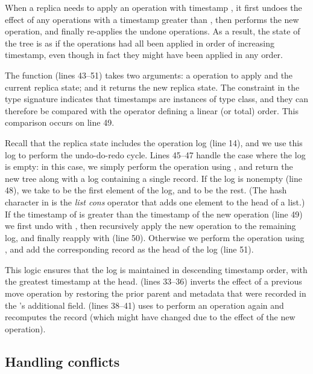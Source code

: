 \documentclass[sigplan,anonymous]{acmart}
\begin{document}
When a replica needs to apply an operation with timestamp , it first undoes the effect of any operations with a timestamp greater than , then performs the new operation, and finally re-applies the undone operations.
As a result, the state of the tree is as if the operations had all been applied in order of increasing timestamp, even though in fact they might have been applied in any order.

The  function (lines 43--51) takes two arguments: a  operation to apply and the current replica state; and it returns the new replica state.
The constraint  in the type signature indicates that timestamps  are instances of  type class, and they can therefore be compared with the \isa{<} operator defining a linear (or total) order.
This comparison occurs on line 49.

Recall that the replica state includes the operation log (line 14), and we use this log to perform the undo-do-redo cycle.
Lines 45--47 handle the case where the log is empty: in this case, we simply perform the operation using , and return the new tree along with a log containing a single  record.
If the log is nonempty (line 48), we take  to be the first element of the log, and  to be the rest.
(The hash character in  is the \emph{list cons} operator that adds one element to the head of a list.)
If the timestamp of  is greater than the timestamp of the new operation (line 49) we first undo  with , then recursively apply the new operation to the remaining log, and finally reapply  with  (line 50).
Otherwise we perform the operation using , and add the corresponding  record as the head of the log (line 51).

This logic ensures that the log is maintained in descending timestamp order, with the greatest timestamp at the head.
 (lines 33--36) inverts the effect of a previous move operation by restoring the prior parent and metadata that were recorded in the 's additional field.
 (lines 38--41) uses  to perform an operation again and recomputes the  record (which might have changed due to the effect of the new operation).

\subsection{Handling conflicts}\label{sec:conflicts}
\end{document}
